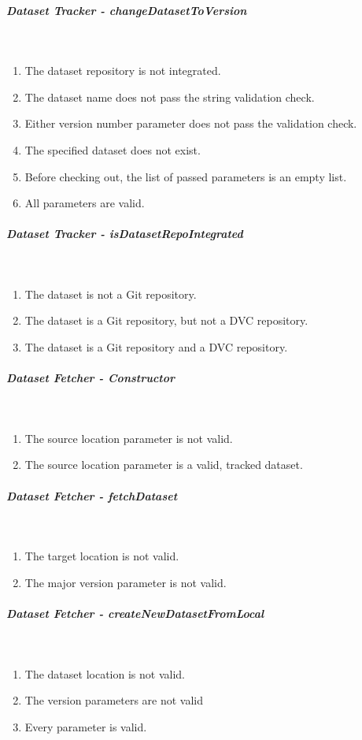 \subparagraph{Dataset Tracker - changeDatasetToVersion} \mbox{}\\
\begin{enumerate}
    \item The dataset repository is not integrated.
    \item The dataset name does not pass the string validation check.
    \item Either version number parameter does not pass the validation check.
    \item The specified dataset does not exist.
    \item Before checking out, the list of passed parameters is an empty list.
    \item All parameters are valid.
\end{enumerate}

\subparagraph{Dataset Tracker - isDatasetRepoIntegrated} \mbox{}\\
\begin{enumerate}
    \item The dataset is not a Git repository.
    \item The dataset is a Git repository, but not a DVC repository.
    \item The dataset is a Git repository and a DVC repository.
\end{enumerate}

\subparagraph{Dataset Fetcher - Constructor} \mbox{}\\
\begin{enumerate}
    \item The source location parameter is not valid.
    \item The source location parameter is a valid, tracked dataset.
\end{enumerate}

\subparagraph{Dataset Fetcher - fetchDataset} \mbox{}\\
\begin{enumerate}
    \item The target location is not valid.
    \item The major version parameter is not valid.
\end{enumerate}

\subparagraph{Dataset Fetcher - createNewDatasetFromLocal} \mbox{}\\
\begin{enumerate}
    \item The dataset location is not valid.
    \item The version parameters are not valid
    \item Every parameter is valid.
\end{enumerate}

